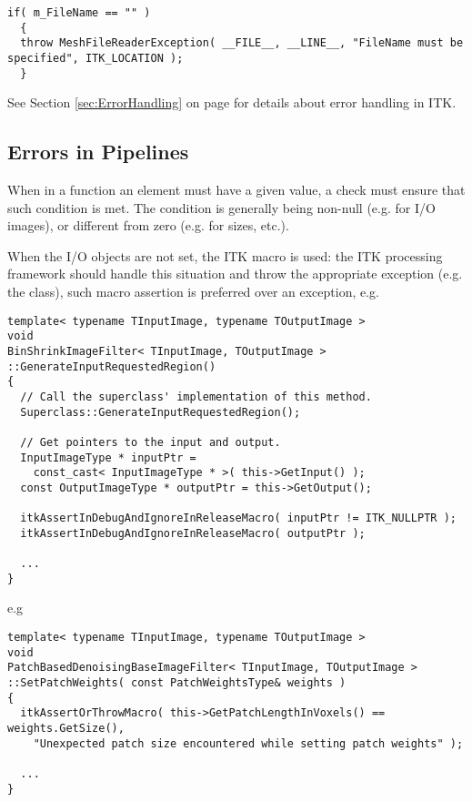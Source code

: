 \small
\begin{verbatim}
if( m_FileName == "" )
  {
  throw MeshFileReaderException( __FILE__, __LINE__, "FileName must be specified", ITK_LOCATION );
  }
\end{verbatim}
\normalsize

See Section \ref{sec:ErrorHandling} on page \pageref{sec:ErrorHandling} for
details about error handling in ITK.


\subsection{Errors in Pipelines}
\label{subsec:ErrorsInPipelines}

When in a function an element must have a given value, a check must ensure that
such condition is met. The condition is generally being non-null (e.g. for I/O
images), or different from zero (e.g. for sizes, etc.).

When the I/O objects are not set, the ITK
 macro is used: the ITK processing
framework should handle this situation and throw the appropriate exception (e.g.
the  class), such macro assertion is preferred over
an exception, e.g.

\small
\begin{verbatim}
template< typename TInputImage, typename TOutputImage >
void
BinShrinkImageFilter< TInputImage, TOutputImage >
::GenerateInputRequestedRegion()
{
  // Call the superclass' implementation of this method.
  Superclass::GenerateInputRequestedRegion();

  // Get pointers to the input and output.
  InputImageType * inputPtr =
    const_cast< InputImageType * >( this->GetInput() );
  const OutputImageType * outputPtr = this->GetOutput();

  itkAssertInDebugAndIgnoreInReleaseMacro( inputPtr != ITK_NULLPTR );
  itkAssertInDebugAndIgnoreInReleaseMacro( outputPtr );

  ...
}
\end{verbatim}
\normalsize

e.g

\small
\begin{verbatim}
template< typename TInputImage, typename TOutputImage >
void
PatchBasedDenoisingBaseImageFilter< TInputImage, TOutputImage >
::SetPatchWeights( const PatchWeightsType& weights )
{
  itkAssertOrThrowMacro( this->GetPatchLengthInVoxels() == weights.GetSize(),
    "Unexpected patch size encountered while setting patch weights" );

  ...
}
\end{verbatim}
\normalsize

